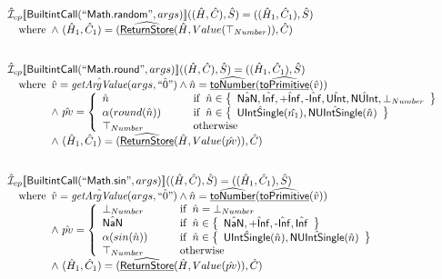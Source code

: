 \[
\begin{array}{l}
\aI _{cp}\lbr \SF{BuiltintCall}(``\SF{Math.random}",args)\rbr((\hat{H},\hat{C}), \hat{S})
  = ((\hat{H}_1, \hat{C}_1), \hat{S})\\
\quad\wherec{
  \land\ (\hat{H}_1, \hat{C}_1) = (\ahf{ReturnStore}(\hat{H}, Value(\top_{Number})), \hat{C})
  }\\
\\\\



\aI _{cp}\lbr \SF{BuiltintCall}(``\SF{Math.round}",args)\rbr((\hat{H},\hat{C}), \hat{S})
  = ((\hat{H}_1, \hat{C}_1), \hat{S})\\
\quad\wherec{
  \hat{v}=\hat{\hf{getArgValue}}(args, \hat{``0"}) \land \hat{n}=\ahf{toNumber}(\ahf{toPrimitive}(\hat{v}))\\
  \land\ \hat{pv}   = 
  \left\{
    \begin{array}{l@{\quad\quad\quad}l}
      \hat{n} & \ifc{\hat{n} \in \set{\hat{\SF{NaN}}, \hat{\SF{Inf}}, \hat{\SF{+Inf}}, \hat{\SF{-Inf}}, \hat{\SF{UInt}}, \hat{\SF{NUInt}}, \bot_{Number}}}\\
      \alpha(round(\hat{n})) & \ifc{\hat{n} \in \set{\hat{\SF{UIntSingle}}(\hat{n_1}), \hat{\SF{NUIntSingle}}(\hat{n})}}\\
      \top_{Number} & \owc\\
    \end{array}
  \right.\\
  \land\ (\hat{H}_1, \hat{C}_1) = (\ahf{ReturnStore}(\hat{H}, Value(\hat{pv})), \hat{C})
  }\\
\\\\



\aI _{cp}\lbr \SF{BuiltintCall}(``\SF{Math.sin}",args)\rbr((\hat{H},\hat{C}), \hat{S})
  = ((\hat{H}_1, \hat{C}_1), \hat{S})\\
\quad\wherec{
  \hat{v}=\hat{\hf{getArgValue}}(args, \hat{``0"}) \land \hat{n}=\ahf{toNumber}(\ahf{toPrimitive}(\hat{v}))\\
  \land\ \hat{pv}   = 
  \left\{
    \begin{array}{l@{\quad\quad\quad}l}
      \bot_{Number} & \ifc{\hat{n} = \bot_{Number}}\\
      \hat{\SF{NaN}} & \ifc{\hat{n} \in \set{\hat{\SF{NaN}}, \hat{\SF{+Inf}}, \hat{\SF{-Inf}}, \hat{\SF{Inf}}}}\\
      \alpha(sin(\hat{n})) & \ifc{\hat{n} \in \set{\hat{\SF{UIntSingle}}(\hat{n}), \hat{\SF{NUIntSingle}}(\hat{n})}}\\
      \top_{Number} & \owc\\
    \end{array}
  \right.\\
  \land\ (\hat{H}_1, \hat{C}_1) = (\ahf{ReturnStore}(\hat{H}, Value(\hat{pv})), \hat{C})
  }\\
\\\\




\end{array}\]
